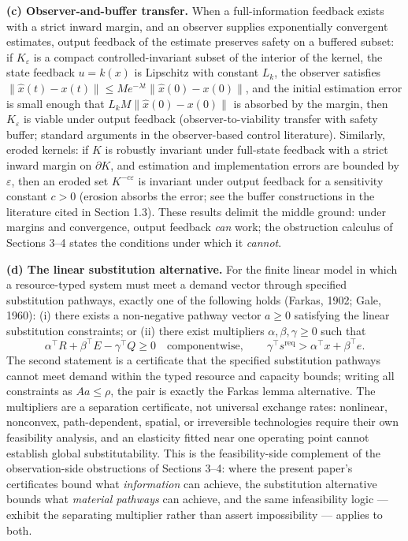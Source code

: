 \documentclass[11pt]{article}
\begin{document}
\textbf{(c) Observer-and-buffer transfer.} When a full-information
feedback exists with a strict inward margin, and an observer supplies
exponentially convergent estimates, output feedback of the estimate
preserves safety on a buffered subset: if \(K_\varepsilon\) is a compact
controlled-invariant subset of the interior of the kernel, the state
feedback \(u = k(x)\) is Lipschitz with constant \(L_k\), the observer
satisfies
\(\|\hat x(t) - x(t)\| \le M e^{-\lambda t}\|\hat x(0) - x(0)\|\), and
the initial estimation error is small enough that
\(L_k M \|\hat x(0) - x(0)\|\) is absorbed by the margin, then
\(K_\varepsilon\) is viable under output feedback (observer-to-viability
transfer with safety buffer; standard arguments in the observer-based
control literature). Similarly, eroded kernels: if \(K\) is robustly
invariant under full-state feedback with a strict inward margin on
\(\partial K\), and estimation and implementation errors are bounded by
\(\varepsilon\), then an eroded set \(K^{-c\varepsilon}\) is invariant
under output feedback for a sensitivity constant \(c > 0\) (erosion
absorbs the error; see the buffer constructions in the literature cited in Section 1.3). These results delimit the middle ground: under margins and
convergence, output feedback \emph{can} work; the obstruction calculus
of Sections 3--4 states the conditions under which it \emph{cannot}.

\textbf{(d) The linear substitution alternative.} For the finite linear
model in which a resource-typed system must meet a demand vector through specified substitution pathways, exactly one of the following holds
(Farkas, 1902; Gale, 1960): (i) there exists a non-negative pathway
vector \(a \ge 0\) satisfying the linear substitution constraints; or
(ii) there exist multipliers \(\alpha, \beta, \gamma \ge 0\) such that
\[\alpha^\top R + \beta^\top E - \gamma^\top Q \ge 0 \quad\text{componentwise},\qquad \gamma^\top s^{\mathrm{req}} > \alpha^\top x + \beta^\top e.\]
The second statement is a certificate that the specified substitution pathways cannot meet demand within the typed resource and capacity
bounds; writing all constraints as \(Aa \le \rho\), the pair is exactly
the Farkas lemma alternative. The multipliers are a separation
certificate, not universal exchange rates: nonlinear, nonconvex,
path-dependent, spatial, or irreversible technologies require their own
feasibility analysis, and an elasticity fitted near one operating point
cannot establish global substitutability. This is the feasibility-side
complement of the observation-side obstructions of Sections 3--4: where
the present paper's certificates bound what \emph{information} can
achieve, the substitution alternative bounds what \emph{material
pathways} can achieve, and the same infeasibility logic --- exhibit the separating multiplier rather than assert impossibility --- applies to both.
\end{document}
